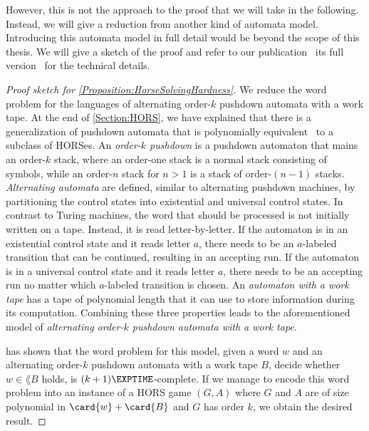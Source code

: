\documentclass[../../diss.tex]{subfiles}
\begin{document}
However, this is not the approach to the proof that we will take in the following.
Instead, we will give a reduction from another kind of automata model.
Introducing this automata model in full detail would be beyond the scope of this thesis.
We will give a sketch of the proof and refer to our publication~\cite{HagueMM17} \resp its full version~\cite{HagueMM17a} for the technical details.

\begin{proof}[Proof sketch for \cref{Proposition:HorseSolvingHardness}]
    We reduce the word problem for the languages of alternating order-$k$ pushdown automata with a work tape.
    At the end of \cref{Section:HORS}, we have explained that there is a generalization of pushdown automata that is polynomially equivalent~\cite{KnapikNU02} to a subclass of HORSes.
    An \emph{order-$k$ pushdown} is a pushdown automaton that mains an order-$k$ stack, where an order-one stack is a normal stack consisting of symbols, while an order-$n$ stack for $n > 1$ is a stack of order-$(n-1)$ stacks.
    \emph{Alternating automata} are defined, similar to alternating pushdown machines, by partitioning the control states into existential and universal control states.
    In contrast to Turing machines, the word that should be processed is not initially written on a tape.
    Instead, it is read letter-by-letter.
    If the automaton is in an existential control state and it reads letter $a$, there needs to be an $a$-labeled transition that can be continued, resulting in an accepting run.
    If the automaton is in a universal control state and it reads letter $a$, there needs to be an accepting run no matter which $a$-labeled transition is chosen.
    An \emph{automaton with a work tape} has a tape of polynomial length that it can use to store information during its computation.
    Combining these three properties leads to the aforementioned model of \emph{alternating order-$k$ pushdown automata with a work tape}.

     has shown that the word problem for this model, given a word $w$ and an alternating order-$k$ pushdown automata with a work tape $B$, decide whether $w \in \lang{B}$ holds, is $(k+1)\EXPTIME$-complete.
    If we manage to encode this word problem into an instance of a HORS game $(G,A)$ where $G$ and $A$ are of size polynomial in $\card{w} + \card{B}$ and $G$ has order $k$, we obtain the desired result.


\end{proof}
\end{document}
